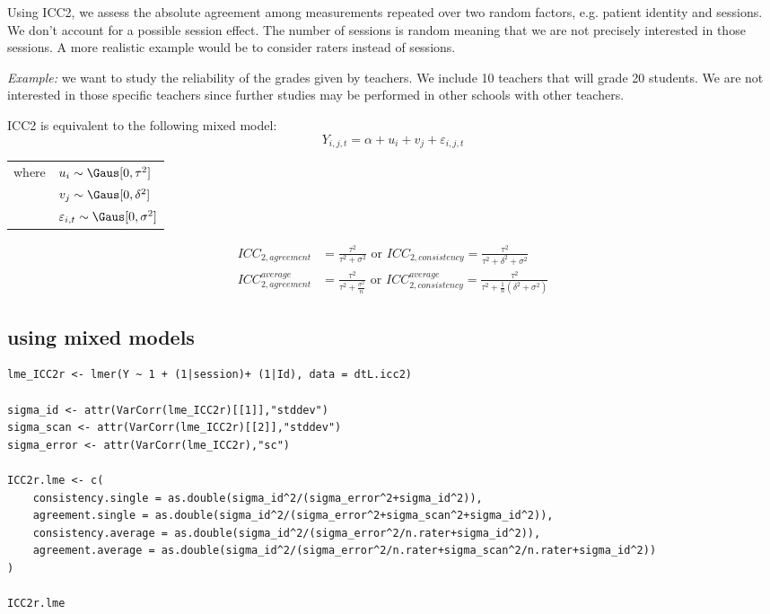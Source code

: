 \documentclass{article}
\begin{document}
Using ICC2, we assess the absolute agreement among measurements
repeated over two random factors, e.g. patient identity and
sessions. We don't account for a possible session effect. The number
of sessions is random meaning that we are not precisely interested in
those sessions. A more realistic example would be to consider raters
instead of sessions.

\bigskip

\emph{Example:} we want to study the reliability of the grades given by
teachers. We include 10 teachers that will grade 20 students. We are
not interested in those specific teachers since further studies may be
performed in other schools with other teachers.

\bigskip

ICC2 is equivalent to the following mixed model:
\begin{equation}
Y_{i,j,t} = \alpha + u_{i} + v_{j} + \varepsilon_{i,j,t}
\end{equation}

\begin{tabular}{ll}
where & \(u_{i} \sim \Gaus[0,\tau^2] \) \\
 &  \(v_{j} \sim \Gaus[0,\delta^2] \) \\
 & \(\varepsilon_{i,t} \sim \Gaus[0,\sigma^2] \) \\
\end{tabular}

\begin{align}
 ICC_{2,agreement} &= \frac{\tau^2}{\tau^2 + \sigma^2} \text{ or } ICC_{2,consistency} = \frac{\tau^2}{\tau^2 + \delta^2 + \sigma^2} \\
 ICC^{average}_{2,agreement} &= \frac{\tau^2}{\tau^2 + \frac{\sigma^2}{n}} \text{ or } ICC^{average}_{2,consistency} = \frac{\tau^2}{\tau^2 + \frac{1}{n}(\delta^2 + \sigma^2)}
\end{align}


\bigskip

\subsection{using mixed models}
\label{sec:org6f86828}
\lstset{language=r,label= ,caption= ,captionpos=b,numbers=none}
\begin{lstlisting}
lme_ICC2r <- lmer(Y ~ 1 + (1|session)+ (1|Id), data = dtL.icc2)

sigma_id <- attr(VarCorr(lme_ICC2r)[[1]],"stddev")
sigma_scan <- attr(VarCorr(lme_ICC2r)[[2]],"stddev")
sigma_error <- attr(VarCorr(lme_ICC2r),"sc")

ICC2r.lme <- c(
    consistency.single = as.double(sigma_id^2/(sigma_error^2+sigma_id^2)),
    agreement.single = as.double(sigma_id^2/(sigma_error^2+sigma_scan^2+sigma_id^2)),
    consistency.average = as.double(sigma_id^2/(sigma_error^2/n.rater+sigma_id^2)),
    agreement.average = as.double(sigma_id^2/(sigma_error^2/n.rater+sigma_scan^2/n.rater+sigma_id^2))
)

ICC2r.lme
\end{lstlisting}
\end{document}
